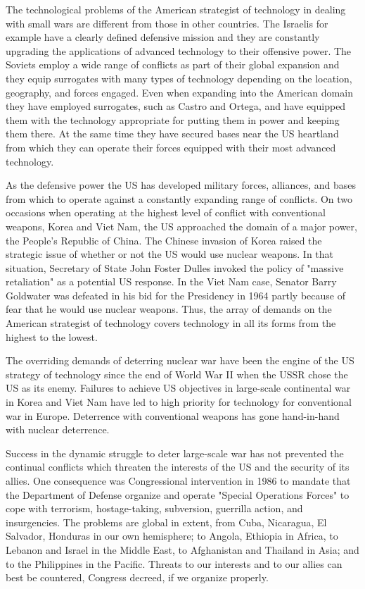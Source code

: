 The technological problems of the American strategist of technology in dealing with small wars are different from those in other countries. The Israelis for example have a clearly defined defensive mission and they are constantly upgrading the applications of advanced technology to their offensive power. The Soviets employ a wide range of conflicts as part of their global expansion and they equip surrogates with many types of technology depending on the location, geography, and forces engaged. Even when expanding into the American domain they have employed surrogates, such as Castro and Ortega, and have equipped them with the technology appropriate for putting them in power and keeping them there. At the same time they have secured bases near the US heartland from which they can operate their forces equipped with their most advanced technology.

As the defensive power the US has developed military forces, alliances, and bases from which to operate against a constantly expanding range of conflicts. On two occasions when operating at the highest level of conflict with conventional weapons, Korea and Viet Nam, the US approached the domain of a major power, the People's Republic of China. The Chinese invasion of Korea raised the strategic issue of whether or not the US would use nuclear weapons. In that situation, Secretary of State John Foster Dulles invoked the policy of "massive retaliation" as a potential US response. In the Viet Nam case, Senator Barry Goldwater was defeated in his bid for the Presidency in 1964 partly because of fear that he would use nuclear weapons. Thus, the array of demands on the American strategist of technology covers technology in all its forms from the highest to the lowest.

The overriding demands of deterring nuclear war have been the engine of the US strategy of technology since the end of World War II when the USSR chose the US as its enemy. Failures to achieve US objectives in large-scale continental war in Korea and Viet Nam have led to high priority for technology for conventional war in Europe. Deterrence with conventional weapons has gone hand-in-hand with nuclear deterrence.

Success in the dynamic struggle to deter large-scale war has not prevented the continual conflicts which threaten the interests of the US and the security of its allies. One consequence was Congressional intervention in 1986 to mandate that the Department of Defense organize and operate "Special Operations Forces" to cope with terrorism, hostage-taking, subversion, guerrilla action, and insurgencies. The problems are global in extent, from Cuba, Nicaragua, El Salvador, Honduras in our own hemisphere; to Angola, Ethiopia in Africa, to Lebanon and Israel in the Middle East, to Afghanistan and Thailand in Asia; and to the Philippines in the Pacific. Threats to our interests and to our allies can best be countered, Congress decreed, if we organize properly.

